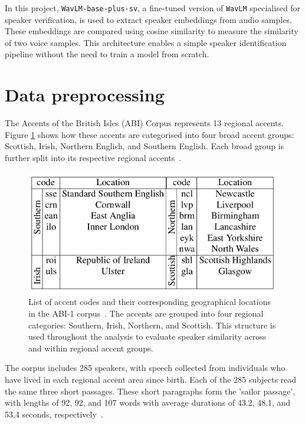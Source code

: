 \documentclass[conference]{IEEEtran}
\begin{document}
	In this project, \texttt{WavLM-base-plus-sv}, a fine-tuned version of \texttt{WavLM} specialised for speaker verification, is used to extract speaker embeddings from audio samples. These embeddings are compared using cosine similarity to measure the similarity of two voice samples. This architecture enables a simple speaker identification pipeline without the need to train a model from scratch.
	
	
	\section{Data preprocessing}
	\label{sec:data-processing}
	
	The Accents of the British Isles (ABI) Corpus represents 13 regional accents. Figure \ref{fig:img-abi-corpus-accents} shows how these accents are categorised into four broad accent groups: Scottish, Irish, Northern English, and Southern English. Each broad group is further split into its respective regional accents~\cite{najafian2016improving}.
	
	\begin{figure}[H]
		\centering
		\includegraphics[width=0.7\linewidth]{img/img-abi-corpus-accents}
		\caption{List of accent codes and their corresponding geographical locations in the ABI-1 corpus~\cite{najafian2016improving}. The accents are grouped into four regional categories: Southern, Irish, Northern, and Scottish. This structure is used throughout the analysis to evaluate speaker similarity across and within regional accent groups.}
		\label{fig:img-abi-corpus-accents}
	\end{figure}
	
	The corpus includes 285 speakers, with speech collected from individuals who have lived in each regional accent area since birth. Each of the 285 subjects read the same three short passages. These short paragraphs form the 'sailor passage', with lengths of 92, 92, and 107 words with average durations of 43.2, 48.1, and 53.4 seconds, respectively~\cite{najafian2016improving}.
	
\end{document}

